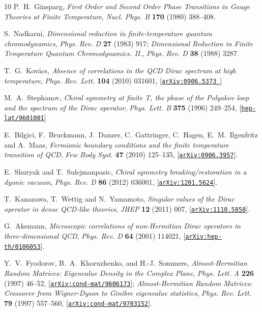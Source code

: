 \documentclass[aps,prl,reprint,graphicx,showpacs]{revtex4-1}
\begin{document}
\begin{thebibliography}{10}
P.~H.~Ginsparg, {\it {First Order and Second Order Phase Transitions in Gauge
  Theories at Finite Temperature}},  {\em Nucl. Phys. B} {\bf 170} (1980)
  388--408.

S.~Nadkarni, {\it {Dimensional reduction in finite-temperature quantum
  chromodynamics}},  {\em Phys. Rev. D} {\bf 27} (1983) 917;  {\it {Dimensional Reduction in Finite Temperature Quantum
  Chromodynamics. II.}},  {\em Phys. Rev. D} {\bf 38} (1988) 3287.

T.~G.~Kov{\'a}cs, {\it  Absence of correlations in the QCD Dirac spectrum at high temperature}, 
{\em Phys. Rev. Lett.} {\bf 104} (2010) 031601, 
[\href{http://arxiv.org/abs/arXiv:0906.5373}{\tt arXiv:0906.5373 }]

M.~A.~Stephanov, {\it Chiral symmetry at finite T, the phase of the Polyakov 
loop and the spectrum of the Dirac operator}, 
{\em Phys. Lett. B} {\bf 375} (1996) 249--254, 
[\href{http://arxiv.org/abs/hep-lat/9601001}{\tt hep-lat/9601001}]

E.~Bilgici, F.~Bruckmann, J.~Danzer, C.~Gattringer, C.~Hagen, E.~M.~Ilgenfritz and A.~Maas, 
{\it Fermionic boundary conditions and the finite temperature transition of QCD}, 
{\em Few Body Syst.} {\bf 47} (2010) 125--135, 
[\href{https://arxiv.org/abs/0906.3957}{\tt arXiv:0906.3957}].

E.~Shuryak and T.~Sulejmanpasic, {\it {Chiral symmetry breaking/restoration in a dyonic vacuum}}, 
{\em Phys. Rev. D} {\bf 86} (2012) 036001, [\href{https://arxiv.org/abs/1201.5624}{\tt arXiv:1201.5624}]. 

T.~Kanazawa, T.~Wettig and N.~Yamamoto, 
{\it Singular values of the Dirac operator in dense QCD-like theories}, {\em JHEP} {\bf 12} (2011) 007, 
[\href{https://arxiv.org/abs/1110.5858}{\tt arXiv:1110.5858}]. 

G.~Akemann, {\it {Microscopic correlations of non-Hermitian Dirac operators in
  three-dimensional QCD}},  {\em Phys. Rev. D} {\bf 64} (2001) 114021,
  [\href{http://arxiv.org/abs/hep-th/0106053}{{\tt arXiv:hep-th/0106053}}].

Y.~V.~Fyodorov, B.~A.~Khoruzhenko, and H.-J.~Sommers, {\it {Almost-Hermitian Random Matrices: Eigenvalue Density in the Complex Plane}},  {\em Phys. Lett. A} {\bf 226} (1997) 46--52,
  [\href{https://arxiv.org/abs/cond-mat/9606173}{{\tt arXiv:cond-mat/9606173}}];
  {\it Almost-Hermitian Random Matrices: Crossover from Wigner-Dyson to Ginibre eigenvalue statistics}, {\em Phys. Rev. Lett.} {\bf 79} (1997) 557--560,
  [\href{https://arxiv.org/abs/cond-mat/9703152}{{\tt arXiv:cond-mat/9703152}}].


\end{thebibliography}
\end{document}
